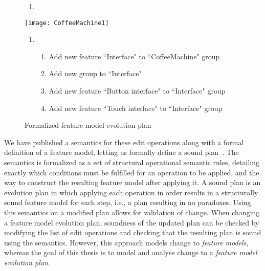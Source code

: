 \begin{figure}
   \footnotesize
   \begin{center}
      \begin{minipage}{0.98\textwidth}
         \begin{enumerate}[{\small $t_0$}]
            \item 
         \end{enumerate}
      \end{minipage}
      \texttt{[image: CoffeeMachine1]}
      \bigskip

      \begin{minipage}{0.98\textwidth}
         \begin{enumerate}[{\small $t_1$}]
            \item 
               \begin{enumerate}[ ]
                  \item Add new \mandatory{} feature ``Interface" to ``CoffeeMachine" \andtype{} group
                  \item Add new \xortype{} group to ``Interface"
                  \item Add new feature ``Button interface" to ``Interface" \xortype{} group
                  \item Add new feature ``Touch interface"  to ``Interface" \xortype{} group               \end{enumerate}
         \end{enumerate}
      \end{minipage}
      \caption{Formalized feature model evolution plan}
      \label{ex:formal-evolution-plan}
   \end{center}
\end{figure}

We have published a semantics for these edit operations along with a formal definition of a feature model, letting us formally define a sound plan~\cite{art:consistency-preserving-evolution-planning}. The semantics is formalized as a set of structural operational semantic rules, detailing exactly which conditions must be fulfilled for an operation to be applied, and the way to construct the resulting feature model after applying it. A sound plan is an evolution plan in which applying each operation in order results in a structurally sound feature model for each step, i.e., a plan resulting in no paradoxes. Using this semantics on a modified plan allows for validation of change. When changing a feature model evolution plan, soundness of the updated plan can be checked by modifying the list of edit operations and checking that the resulting plan is sound using the semantics. However, this approach models change to \emph{feature models}, whereas the goal of this thesis is to model and analyse change to a \emph{feature model evolution plan}. 

